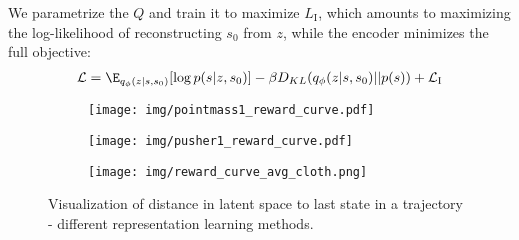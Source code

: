 We parametrize the $Q$ and train it to maximize $L_\text{I}$, which amounts to maximizing the log-likelihood of reconstructing $s_0$ from $z$, while the encoder minimizes the full objective:
\begin{align} \label{eq:isc-vae-loss-adv}
    \mathcal L = \E_{q_\phi(z|s, s_0)} [\log p(s|z, s_0)] - \beta D_{KL}(q_\phi(z|s, s_0)||p(s)) + \mathcal L_\text{I}
\end{align}


\begin{figure}
    \centering
    \begin{subfigure}[b]{0.32\textwidth}
        \texttt{[image: img/pointmass1\_reward\_curve.pdf]}
    \end{subfigure}
    \begin{subfigure}[b]{0.32\textwidth}
        \center
        \texttt{[image: img/pusher1\_reward\_curve.pdf]}
    \end{subfigure}
    \begin{subfigure}[b]{0.32\textwidth}
        \texttt{[image: img/reward\_curve\_avg\_cloth.png]}
    \end{subfigure}
    \caption{Visualization of distance in latent space to last state in a trajectory - different representation learning methods.}
    \label{fig:reward-curves}
\end{figure}


